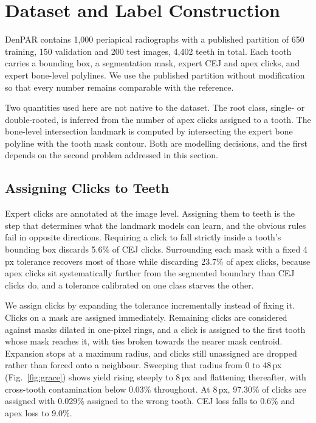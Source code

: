\documentclass[conference]{IEEEtran}
\begin{document}
\section{Dataset and Label Construction}
\label{sec:data}

DenPAR contains 1{,}000 periapical radiographs with a published partition of 650 training, 150 validation and 200 test images, 4{,}402 teeth in total. Each tooth carries a bounding box, a segmentation mask, expert CEJ and apex clicks, and expert bone-level polylines. We use the published partition without modification so that every number remains comparable with the reference.

Two quantities used here are not native to the dataset. The root class, single- or double-rooted, is inferred from the number of apex clicks assigned to a tooth. The bone-level intersection landmark is computed by intersecting the expert bone polyline with the tooth mask contour. Both are modelling decisions, and the first depends on the second problem addressed in this section.

\subsection{Assigning Clicks to Teeth}

Expert clicks are annotated at the image level. Assigning them to teeth is the step that determines what the landmark models can learn, and the obvious rules fail in opposite directions. Requiring a click to fall strictly inside a tooth's bounding box discards 5.6\% of CEJ clicks. Surrounding each mask with a fixed 4\,px tolerance recovers most of those while discarding 23.7\% of apex clicks, because apex clicks sit systematically further from the segmented boundary than CEJ clicks do, and a tolerance calibrated on one class starves the other.

We assign clicks by expanding the tolerance incrementally instead of fixing it. Clicks on a mask are assigned immediately. Remaining clicks are considered against masks dilated in one-pixel rings, and a click is assigned to the first tooth whose mask reaches it, with ties broken towards the nearer mask centroid. Expansion stops at a maximum radius, and clicks still unassigned are dropped rather than forced onto a neighbour. Sweeping that radius from 0 to 48\,px (Fig.~\ref{fig:grace}) shows yield rising steeply to 8\,px and flattening thereafter, with cross-tooth contamination below 0.03\% throughout. At 8\,px, 97.30\% of clicks are assigned with 0.029\% assigned to the wrong tooth. CEJ loss falls to 0.6\% and apex loss to 9.0\%.
\end{document}
